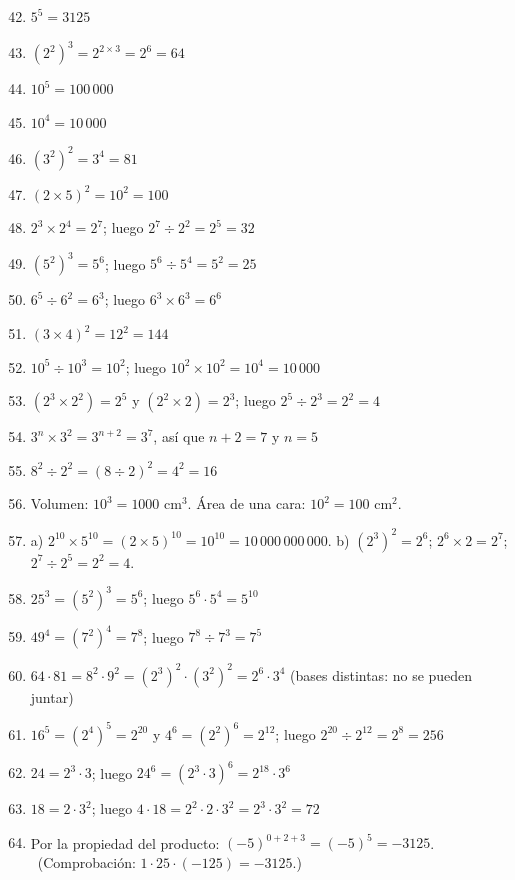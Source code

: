 \documentclass[12pt, letterpaper]{article}
\begin{document}
\begin{enumerate}[leftmargin=*, label=\textbf{\arabic*.}]
  \setcounter{enumi}{41}
  \item $5^5 = 3125$
  \item $(2^2)^3 = 2^{2 \times 3} = 2^6 = 64$
  \item $10^5 = 100\,000$
  \item $10^4 = 10\,000$
  \item $(3^2)^2 = 3^4 = 81$
  \item $(2 \times 5)^2 = 10^2 = 100$
  \item $2^3 \times 2^4 = 2^7$; luego $2^7 \div 2^2 = 2^5 = 32$
  \item $(5^2)^3 = 5^6$; luego $5^6 \div 5^4 = 5^2 = 25$
  \item $6^5 \div 6^2 = 6^3$; luego $6^3 \times 6^3 = 6^6$
  \item $(3 \times 4)^2 = 12^2 = 144$
  \item $10^5 \div 10^3 = 10^2$; luego $10^2 \times 10^2 = 10^4 = 10\,000$
  \item $(2^3 \times 2^2) = 2^5$ y $(2^2 \times 2) = 2^3$; luego $2^5 \div 2^3 = 2^2 = 4$
  \item $3^n \times 3^2 = 3^{n+2} = 3^7$, así que $n + 2 = 7$ y $n = 5$
  \item $8^2 \div 2^2 = (8 \div 2)^2 = 4^2 = 16$
  \item Volumen: $10^3 = 1000$ cm$^3$. Área de una cara: $10^2 = 100$ cm$^2$.
  \item a) $2^{10} \times 5^{10} = (2 \times 5)^{10} = 10^{10} = 10\,000\,000\,000$. \quad b) $(2^3)^2 = 2^6$; $2^6 \times 2 = 2^7$; $2^7 \div 2^5 = 2^2 = 4$.
  \item $25^3 = (5^2)^3 = 5^6$; luego $5^6 \cdot 5^4 = 5^{10}$
  \item $49^4 = (7^2)^4 = 7^8$; luego $7^8 \div 7^3 = 7^5$
  \item $64 \cdot 81 = 8^2 \cdot 9^2 = (2^3)^2 \cdot (3^2)^2 = 2^6 \cdot 3^4$ (bases distintas: no se pueden juntar)
  \item $16^5 = (2^4)^5 = 2^{20}$ y $4^6 = (2^2)^6 = 2^{12}$; luego $2^{20} \div 2^{12} = 2^8 = 256$
  \item $24 = 2^3 \cdot 3$; luego $24^6 = (2^3 \cdot 3)^6 = 2^{18} \cdot 3^6$
  \item $18 = 2 \cdot 3^2$; luego $4 \cdot 18 = 2^2 \cdot 2 \cdot 3^2 = 2^3 \cdot 3^2 = 72$
  \item Por la propiedad del producto: $(-5)^{0+2+3} = (-5)^5 = -3125$. \ (Comprobación: $1 \cdot 25 \cdot (-125) = -3125$.)

\end{enumerate}
\end{document}
